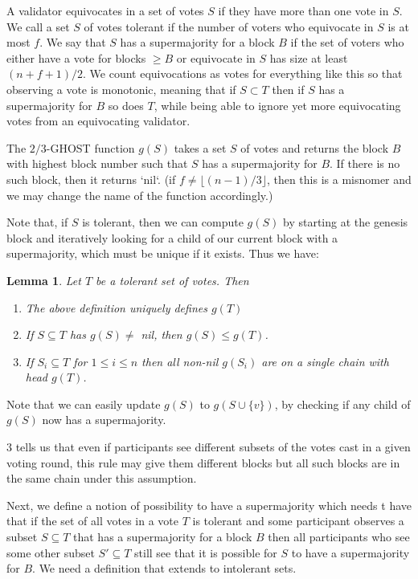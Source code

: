 \documentclass{article}
\newtheorem{lemma}[theorem]{Lemma}
\begin{document}
A validator equivocates in a set of votes $S$ if they have more than one vote in $S$. We call a set $S$ of votes tolerant if the number of voters who equivocate in $S$ is at most $f$. We say that $S$ has a supermajority for a block $B$ if the set of voters who either have a vote for blocks $\geq B$ or equivocate in $S$ has size at least $(n+f+1)/2$.  We count equivocations as votes for everything like this so that observing a vote is monotonic, meaning that if $S \subset T$ then if $S$ has a supermajority for $B$ so does $T$, while being able to ignore yet more equivocating votes from an equivocating validator.

The $2/3$-GHOST function $g(S)$ takes a set $S$ of votes and returns the block $B$ with highest block number such that $S$ has a supermajority for $B$.
If there is no such block, then it returns `nil`. (if $f \neq \lfloor (n-1)/3 \rfloor$, then this is a misnomer and we may change the name of the function accordingly.)

Note that, if $S$ is tolerant, then we can compute $g(S)$ by starting at the genesis block and iteratively looking for a child of our current block with a supermajority, which must be unique if it exists. Thus we have:
\begin{lemma} \label{lem:ghost-monotonicity}
Let $T$ be a tolerant set of votes. Then
\begin{enumerate}
\item The above definition uniquely defines $g(T)$
\item If $S \subseteq T$ has $g(S) \neq$ nil, then $g(S) \leq g(T)$.
\item If $S_i \subseteq T$ for $1 \leq i \leq n$ then all non-nil $g(S_i)$ are on a single chain with head $g(T)$.
\end{enumerate}

\end{lemma}

Note that we can easily update $g(S)$ to $g(S \cup \{v\})$, by checking if any child of $g(S)$ now has a supermajority.

3 tells us that even if participants see different subsets of the votes cast in a given voting round, this rule may give them different blocks but all such blocks are in the same chain under this assumption. 

Next, we define a notion of possibility to have a supermajority which needs t have that if the set of all votes in a vote $T$ is tolerant and some participant observes a subset $S \subseteq T$ that has a supermajority for a block $B$ then all participants who see some other subset $S' \subseteq T$ still see that it is possible for $S$ to have a supermajority for $B$. We need a definition that extends to intolerant sets.
\end{document}
